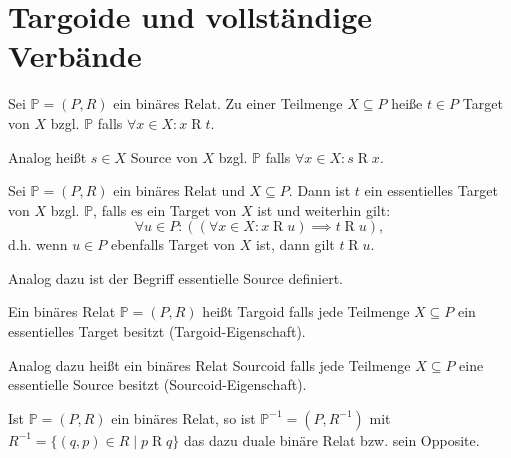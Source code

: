 \documentclass{article}
\begin{document}
\newpage
\section{Targoide und vollständige Verbände}

\begin{definition}
  Sei $\mathbb{P} = (P, R)$ ein binäres Relat.
  Zu einer Teilmenge $X \subseteq P$ heiße $t \in P$ Target von $X$ bzgl. $\mathbb{P}$ falls
  $\forall x \in X \colon x \mathrel{R} t$.

  Analog heißt $s \in X$ Source von $X$ bzgl. $\mathbb{P}$ falls
  $\forall x \in X \colon s \mathrel{R} x$.
\end{definition}

\begin{definition}
  Sei $\mathbb{P} = (P, R)$ ein binäres Relat und $X \subseteq P$.
  Dann ist $t$ ein essentielles Target von $X$ bzgl. $\mathbb{P}$, falls es ein Target von $X$ ist
  und weiterhin gilt: 
  \begin{equation*}
    \forall u \in P \colon ((\forall x \in X \colon x \mathrel{R} u) \implies t \mathrel{R} u),
  \end{equation*}
  d.h. wenn $u \in P$ ebenfalls Target von $X$ ist, dann gilt $t \mathrel{R} u$.

  Analog dazu ist der Begriff essentielle Source definiert.
\end{definition}

\begin{definition}
  Ein binäres Relat $\mathbb{P} = (P, R)$ heißt Targoid falls
  jede Teilmenge $X \subseteq P$ ein essentielles Target besitzt (Targoid-Eigenschaft).

  Analog dazu heißt ein binäres Relat Sourcoid falls
  jede Teilmenge $X \subseteq P$ eine essentielle Source besitzt (Sourcoid-Eigenschaft).
\end{definition}

\begin{definition}
  Ist $\mathbb{P} = (P, R)$ ein binäres Relat,
  so ist $\mathbb{P}^{-1} = (P, R^{-1})$ mit $R^{-1} = \{ (q, p) \in R \mid p \mathrel{R} q \}$
  das dazu duale binäre Relat bzw. sein Opposite.
\end{definition}
\end{document}
